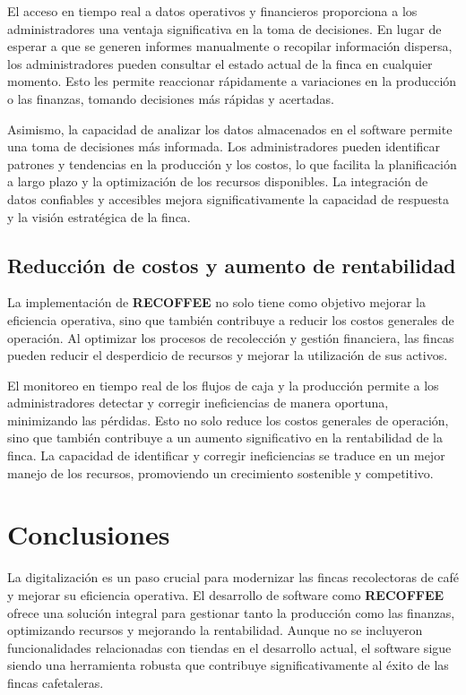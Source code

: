 \documentclass[a4paper,12pt]{article}
\begin{document}
El acceso en tiempo real a datos operativos y financieros proporciona a los administradores una ventaja significativa en la toma de decisiones. En lugar de esperar a que se generen informes manualmente o recopilar información dispersa, los administradores pueden consultar el estado actual de la finca en cualquier momento. Esto les permite reaccionar rápidamente a variaciones en la producción o las finanzas, tomando decisiones más rápidas y acertadas.

Asimismo, la capacidad de analizar los datos almacenados en el software permite una toma de decisiones más informada. Los administradores pueden identificar patrones y tendencias en la producción y los costos, lo que facilita la planificación a largo plazo y la optimización de los recursos disponibles. La integración de datos confiables y accesibles mejora significativamente la capacidad de respuesta y la visión estratégica de la finca.

\subsection*{Reducción de costos y aumento de rentabilidad}

La implementación de \textbf{RECOFFEE} no solo tiene como objetivo mejorar la eficiencia operativa, sino que también contribuye a reducir los costos generales de operación. Al optimizar los procesos de recolección y gestión financiera, las fincas pueden reducir el desperdicio de recursos y mejorar la utilización de sus activos.

El monitoreo en tiempo real de los flujos de caja y la producción permite a los administradores detectar y corregir ineficiencias de manera oportuna, minimizando las pérdidas. Esto no solo reduce los costos generales de operación, sino que también contribuye a un aumento significativo en la rentabilidad de la finca. La capacidad de identificar y corregir ineficiencias se traduce en un mejor manejo de los recursos, promoviendo un crecimiento sostenible y competitivo.


\section*{Conclusiones}

La digitalización es un paso crucial para modernizar las fincas recolectoras de café y mejorar su eficiencia operativa. El desarrollo de software como \textbf{RECOFFEE} ofrece una solución integral para gestionar tanto la producción como las finanzas, optimizando recursos y mejorando la rentabilidad. Aunque no se incluyeron funcionalidades relacionadas con tiendas en el desarrollo actual, el software sigue siendo una herramienta robusta que contribuye significativamente al éxito de las fincas cafetaleras.
\end{document}
